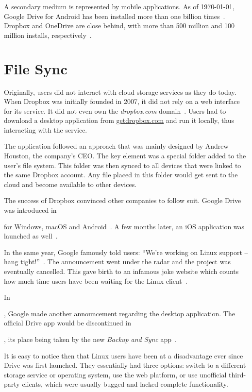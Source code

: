 A secondary medium is represented by mobile applications. As of \monthyeardate\today, Google Drive for Android has been installed more than one billion times~\cite{google_drive_android_app}. Dropbox and OneDrive are close behind, with more than 500 million and 100 million installs, respectively~\cite{dropbox_android_app,one_drive_android_app}.

\section{File Sync}

Originally, users did not interact with cloud storage services as they do today. When Dropbox was initially founded in 2007, it did not rely on a web interface for its service. It did not even own the \emph{dropbox.com} domain~\cite{dropbox_acquires_dropbox_dot_com}. Users had to download a desktop application from \url{getdropbox.com} and run it locally, thus interacting with the service.

The application followed an approach that was mainly designed by Andrew Houston, the company's CEO. The key element was a special folder added to the user's file system. This folder was then synced to all devices that were linked to the same Dropbox account. Any file placed in this folder would get sent to the cloud and become available to other devices.

The success of Dropbox convinced other companies to follow suit. Google Drive was introduced in \date{April 2012} for Windows, macOS and Android~\cite{introducing_google_drive}. A few months later, an iOS application was launched as well~\cite{hands_on_with_the_google_drive_for_ios_app}.

In the same year, Google famously told users: ``We're working on Linux support -- hang tight!''~\cite{google_drive_for_linux_is_on_the_way}. The announcement went under the radar and the project was eventually cancelled. This gave birth to an infamous joke website which counts how much time users have been waiting for the Linux client~\cite{how_long_since_google_said_hang_tight}.

In \date{September 2017}, Google made another announcement regarding the desktop application. The official Drive app would be discontinued in \date{March 2018}, its place being taken by the new \emph{Backup and Sync} app~\cite{introducing_backup_and_sync,google_drive_is_being_replaced_by_backup_and_sync}.

It is easy to notice then that Linux users have been at a disadvantage ever since Drive was first launched. They essentially had three options: switch to a different storage service or operating system, use the web platform, or use unofficial third-party clients, which were usually bugged and lacked complete functionality.

